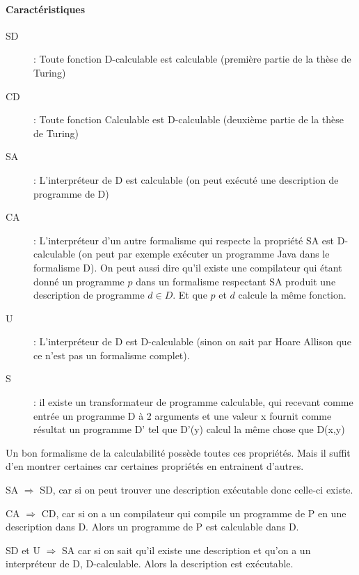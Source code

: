 \paragraph{Caractéristiques} 
\begin{description}
	\item[SD] : Toute fonction D-calculable est calculable (première partie 
		de la thèse de Turing)
	\item[CD] : Toute fonction Calculable est D-calculable (deuxième partie 
		de la thèse de Turing)
	\item[SA] : L'interpréteur de D est calculable (on peut exécuté une 
		description de programme de D)
	\item[CA] : L'interpréteur d'un autre formalisme qui respecte la 
		propriété SA est 
		D-calculable (on peut par exemple exécuter un programme Java 
		dans le formalisme D). On peut aussi dire qu'il existe une 
		compilateur qui étant donné un programme $p$ dans un formalisme 
		respectant SA produit une description de programme $d \in D$. 
		Et que $p$ et $d$ calcule la même fonction.
	\item[U] : L'interpréteur de D est D-calculable (sinon on sait par 
		Hoare Allison que ce n'est pas un formalisme complet).
	\item[S] : il existe un transformateur de programme calculable, qui 
		recevant comme entrée un programme D à 2 arguments et une valeur 
		x fournit comme résultat un programme D' tel que D'(y) calcul 
		la même chose que D(x,y)
\end{description}
Un bon formalisme de la calculabilité possède toutes ces propriétés. Mais il 
suffit d'en montrer certaines car certaines propriétés en entrainent d'autres.

\begin{myprop}
	SA $\Rightarrow$ SD, car si on peut trouver une description exécutable 
	donc celle-ci existe.
\end{myprop}

\begin{myprop}
	CA $\Rightarrow$ CD, car si on a un compilateur qui compile un programme 
	de P en une description dans D. Alors un programme de P est calculable dans D.
\end{myprop}

\begin{myprop}
	SD et U $\Rightarrow$ SA car si on sait qu'il existe une description et 
qu'on a un interpréteur de D, D-calculable. Alors la description est exécutable.
\end{myprop}

